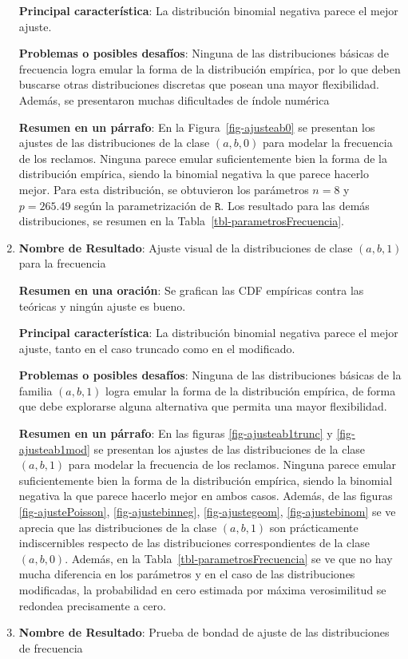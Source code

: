 \documentclass[
  letterpaper,
  onepage,
  openany]{scrreprt}
\begin{document}
\begin{enumerate}
  \textbf{Principal característica}: La distribución binomial negativa
  parece el mejor ajuste.

  \textbf{Problemas o posibles desafíos}: Ninguna de las distribuciones
  básicas de frecuencia logra emular la forma de la distribución
  empírica, por lo que deben buscarse otras distribuciones discretas que
  posean una mayor flexibilidad. Además, se presentaron muchas
  dificultades de índole numérica

  \textbf{Resumen en un párrafo}: En la Figura~\ref{fig-ajusteab0} se
  presentan los ajustes de las distribuciones de la clase \((a,b,0)\)
  para modelar la frecuencia de los reclamos. Ninguna parece emular
  suficientemente bien la forma de la distribución empírica, siendo la
  binomial negativa la que parece hacerlo mejor. Para esta distribución,
  se obtuvieron los parámetros \(n=8\) y \(p =265.49\) según la
  parametrización de \(\texttt{R}\). Los resultado para las demás
  distribuciones, se resumen en la Tabla~\ref{tbl-parametrosFrecuencia}.
\item
  \textbf{Nombre de Resultado}: Ajuste visual de la distribuciones de
  clase \((a,b,1)\) para la frecuencia

  \textbf{Resumen en una oración}: Se grafican las CDF empíricas contra
  las teóricas y ningún ajuste es bueno.

  \textbf{Principal característica}: La distribución binomial negativa
  parece el mejor ajuste, tanto en el caso truncado como en el
  modificado.

  \textbf{Problemas o posibles desafíos}: Ninguna de las distribuciones
  básicas de la familia \((a,b,1)\) logra emular la forma de la
  distribución empírica, de forma que debe explorarse alguna alternativa
  que permita una mayor flexibilidad.

  \textbf{Resumen en un párrafo}: En las figuras
  \ref{fig-ajusteab1trunc} y \ref{fig-ajusteab1mod} se presentan los
  ajustes de las distribuciones de la clase \((a,b,1)\) para modelar la
  frecuencia de los reclamos. Ninguna parece emular suficientemente bien
  la forma de la distribución empírica, siendo la binomial negativa la
  que parece hacerlo mejor en ambos casos. Además, de las figuras
  \ref{fig-ajustePoisson}, \ref{fig-ajustebinneg}, \ref{fig-ajustegeom},
  \ref{fig-ajustebinom} se ve aprecia que las distribuciones de la clase
  \((a,b,1)\) son prácticamente indiscernibles respecto de las
  distribuciones correspondientes de la clase \((a,b,0)\). Además, en la
  Tabla~\ref{tbl-parametrosFrecuencia} se ve que no hay mucha diferencia
  en los parámetros y en el caso de las distribuciones modificadas, la
  probabilidad en cero estimada por máxima verosimilitud se redondea
  precisamente a cero.
\item
  \textbf{Nombre de Resultado}: Prueba de bondad de ajuste de las
  distribuciones de frecuencia


\end{enumerate}
\end{document}
